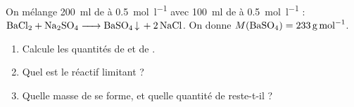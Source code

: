 \documentclass[11pt,a4paper]{article}
\begin{document}
\begin{exo}
On mélange \qty{200}{\milli\litre} de  à \qty{0.5}{\mole\per\litre} avec
\qty{100}{\milli\litre} de  à \qty{0.5}{\mole\per\litre} :
$\ce{BaCl2 + Na2SO4 -> BaSO4 v + 2 NaCl}$. On donne $M(\ce{BaSO4})=\qty{233}{\gram\per\mole}$.
\begin{enumerate}[label=\alph*)]
  \item Calcule les quantités de  et de .
  \item Quel est le réactif limitant ?
  \item Quelle masse de  se forme, et quelle quantité de  reste-t-il ?
\end{enumerate}
\end{exo}
\end{document}

